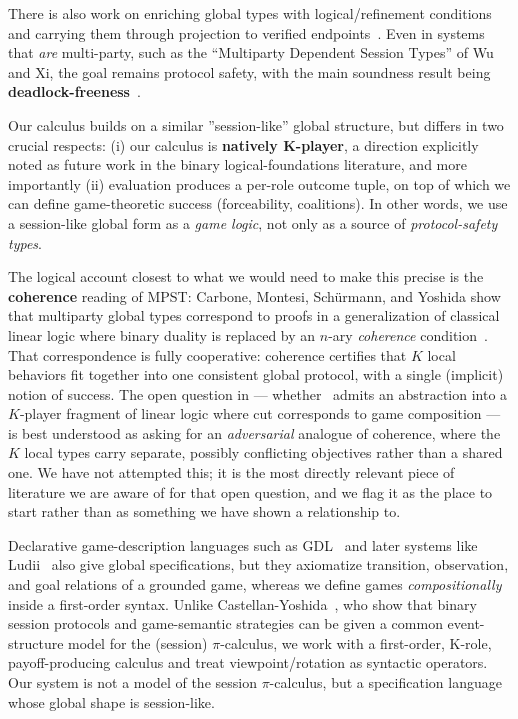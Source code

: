 There is also work on enriching global types with logical/refinement conditions and carrying them through projection to verified endpoints~\cite{japaridze2024propositional,zhou2024refining}. Even in systems that \emph{are} multi-party, such as the ``Multiparty Dependent Session Types'' of Wu and Xi, the goal remains protocol safety, with the main soundness result being \textbf{deadlock-freeness}~\cite{bocchi2010theory,wu2018multiparty,vassor2024refinements}.

Our calculus builds on a similar ''session-like'' global structure, but differs in two crucial respects: (i) our calculus is \textbf{natively K-player}, a direction explicitly noted as future work in the binary logical-foundations literature, and more importantly (ii) evaluation produces a per-role outcome tuple, on top of which we can define game-theoretic success (forceability, coalitions). In other words, we use a session-like global form as a \emph{game logic}, not only as a source of \emph{protocol-safety types}.

The logical account closest to what we would need to make this precise is the \textbf{coherence} reading of MPST: Carbone, Montesi, Sch\"urmann, and Yoshida show that multiparty global types correspond to proofs in a generalization of classical linear logic where binary duality is replaced by an $n$-ary \emph{coherence} condition~\cite{CarboneMontesiSchurmannYoshida2015Coherence}. That correspondence is fully cooperative: coherence certifies that $K$ local behaviors fit together into one consistent global protocol, with a single (implicit) notion of success. The open question in  — whether \KFOL\ admits an abstraction into a $K$-player fragment of linear logic where cut corresponds to game composition — is best understood as asking for an \emph{adversarial} analogue of coherence, where the $K$ local types carry separate, possibly conflicting objectives rather than a shared one. We have not attempted this; it is the most directly relevant piece of literature we are aware of for that open question, and we flag it as the place to start rather than as something we have shown a relationship to.

Declarative game-description languages such as GDL~\cite{LoveHinrichsGenesereth2006GDL} and later systems like Ludii~\cite{PietteEtAl2021LudiiConcepts} also give global specifications, but they axiomatize transition, observation, and goal relations of a grounded game, whereas we define games \emph{compositionally} inside a first-order syntax.
Unlike Castellan-Yoshida~\cite{CastellanYoshidaSessionGame}, who show that binary session protocols and game-semantic strategies can be given a common event-structure model for the (session) $\pi$-calculus, we work with a first-order, K-role, payoff-producing calculus and treat viewpoint/rotation as syntactic operators. Our system is not a model of the session $\pi$-calculus, but a specification language whose global shape is session-like.

